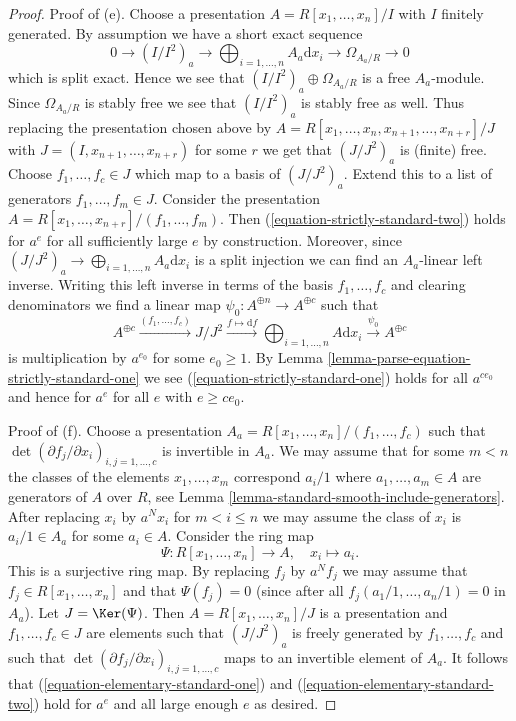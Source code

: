 \begin{proof}
\medskip\noindent
Proof of (e). Choose a presentation
$A = R[x_1, \ldots, x_n]/I$ with $I$ finitely generated.
By assumption we have a short exact sequence
$$
0 \to (I/I^2)_a \to \bigoplus\nolimits_{i = 1, \ldots, n} A_a\text{d}x_i \to
\Omega_{A_a/R} \to 0
$$
which is split exact. Hence we see that
$(I/I^2)_a \oplus \Omega_{A_a/R}$ is a free $A_a$-module.
Since $\Omega_{A_a/R}$ is stably free we see that $(I/I^2)_a$
is stably free as well. Thus replacing the presentation chosen
above by $A = R[x_1, \ldots, x_n, x_{n + 1}, \ldots, x_{n + r}]/J$ with
$J = (I, x_{n + 1}, \ldots, x_{n + r})$ for some $r$ we get that $(J/J^2)_a$
is (finite) free. Choose $f_1, \ldots, f_c \in J$ which map to a basis of
$(J/J^2)_a$. Extend this to a list of generators
$f_1, \ldots, f_m \in J$. Consider the presentation
$A = R[x_1, \ldots, x_{n + r}]/(f_1, \ldots, f_m)$.
Then (\ref{equation-strictly-standard-two}) holds for $a^e$
for all sufficiently large $e$ by construction. Moreover, since
$(J/J^2)_a \to \bigoplus\nolimits_{i = 1, \ldots, n} A_a\text{d}x_i$
is a split injection we can find an $A_a$-linear left inverse.
Writing this left inverse in terms of the basis $f_1, \ldots, f_c$
and clearing denominators we find a linear map
$\psi_0 : A^{\oplus n} \to A^{\oplus c}$ such that
$$
A^{\oplus c} \xrightarrow{(f_1, \ldots, f_c)}
J/J^2 \xrightarrow{f \mapsto \text{d}f}
\bigoplus\nolimits_{i = 1, \ldots, n} A \text{d}x_i
\xrightarrow{\psi_0}
A^{\oplus c}
$$
is multiplication by $a^{e_0}$ for some $e_0 \geq 1$. By
Lemma \ref{lemma-parse-equation-strictly-standard-one}
we see (\ref{equation-strictly-standard-one})
holds for all $a^{ce_0}$ and hence for $a^e$ for all $e$ with $e \geq ce_0$.

\medskip\noindent
Proof of (f). Choose a presentation
$A_a = R[x_1, \ldots, x_n]/(f_1, \ldots, f_c)$ such that
$\det(\partial f_j/\partial x_i)_{i, j = 1, \ldots, c}$
is invertible in $A_a$. We may assume that for some
$m < n$ the classes of the elements $x_1, \ldots, x_m$
correspond $a_i/1$ where $a_1, \ldots, a_m \in A$ are generators of $A$
over $R$, see Lemma \ref{lemma-standard-smooth-include-generators}.
After replacing $x_i$ by $a^Nx_i$ for $m < i \leq n$
we may assume the class of $x_i$ is $a_i/1 \in A_a$ for some
$a_i \in A$. Consider the ring map
$$
\Psi : R[x_1, \ldots, x_n] \longrightarrow A,\quad
x_i \longmapsto a_i.
$$
This is a surjective ring map. By replacing $f_j$ by $a^Nf_j$ we may
assume that $f_j \in R[x_1, \ldots, x_n]$ and that
$\Psi(f_j) = 0$ (since after all $f_j(a_1/1, \ldots, a_n/1) = 0$
in $A_a$). Let $J = \Ker(\Psi)$. Then $A = R[x_1, \ldots, x_n]/J$
is a presentation and $f_1, \ldots, f_c \in J$ are elements such that
$(J/J^2)_a$ is freely generated by $f_1, \ldots, f_c$ and such
that $\det(\partial f_j/\partial x_i)_{i, j = 1, \ldots, c}$
maps to an invertible element of $A_a$. It follows that
(\ref{equation-elementary-standard-one}) and
(\ref{equation-elementary-standard-two})
hold for $a^e$ and all large enough $e$ as desired.
\end{proof}




